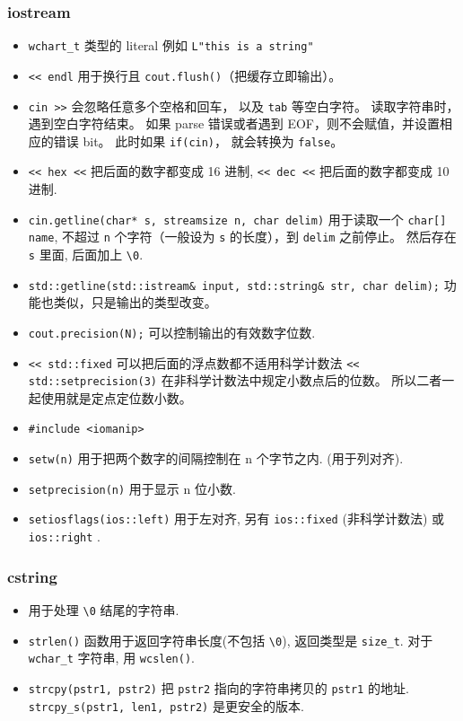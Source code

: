 \subsubsection{iostream}
\begin{itemize}
\item \verb`wchart_t` 类型的 literal 例如 \verb`L"this is a string"`
\item \verb`<< endl` 用于换行且 \verb|cout.flush()|（把缓存立即输出）。
\item \verb|cin >>| 会忽略任意多个空格和回车， 以及 \verb|tab| 等空白字符。 读取字符串时，遇到空白字符结束。 如果 parse 错误或者遇到 EOF，则不会赋值，并设置相应的错误 bit。 此时如果 \verb|if(cin)|， 就会转换为 \verb|false|。
\item \verb`<< hex <<` 把后面的数字都变成 16 进制, \verb`<< dec <<` 把后面的数字都变成 10 进制.
\item \verb`cin.getline(char* s, streamsize n, char delim)` 用于读取一个 \verb`char[] name`, 不超过 \verb|n| 个字符（一般设为 \verb|s| 的长度），到 \verb|delim| 之前停止。 然后存在 \verb|s| 里面, 后面加上 \verb`\0`.
\item \verb|std::getline(std::istream& input, std::string& str, char delim);| 功能也类似，只是输出的类型改变。
\item \verb`cout.precision(N);` 可以控制输出的有效数字位数.
\item \verb|<< std::fixed| 可以把后面的浮点数都不适用科学计数法 \verb|<< std::setprecision(3)| 在非科学计数法中规定小数点后的位数。 所以二者一起使用就是定点定位数小数。
\item \verb`#include <iomanip>`
\item \verb`setw(n)` 用于把两个数字的间隔控制在 n 个字节之内. (用于列对齐).
\item \verb`setprecision(n)` 用于显示 n 位小数.
\item \verb`setiosflags(ios::left)` 用于左对齐, 另有 \verb`ios::fixed` (非科学计数法) 或 \verb`ios::right` .
\end{itemize}

\subsubsection{cstring}
\begin{itemize}
\item 用于处理 \verb`\0` 结尾的字符串.
\item \verb`strlen()` 函数用于返回字符串长度(不包括 \verb`\0`), 返回类型是 \verb`size_t`. 对于 \verb`wchar_t` 字符串, 用 \verb`wcslen()`.
\item \verb`strcpy(pstr1, pstr2)` 把 \verb`pstr2` 指向的字符串拷贝的 \verb`pstr1` 的地址. \verb`strcpy_s(pstr1, len1, pstr2)` 是更安全的版本.
\end{itemize}

